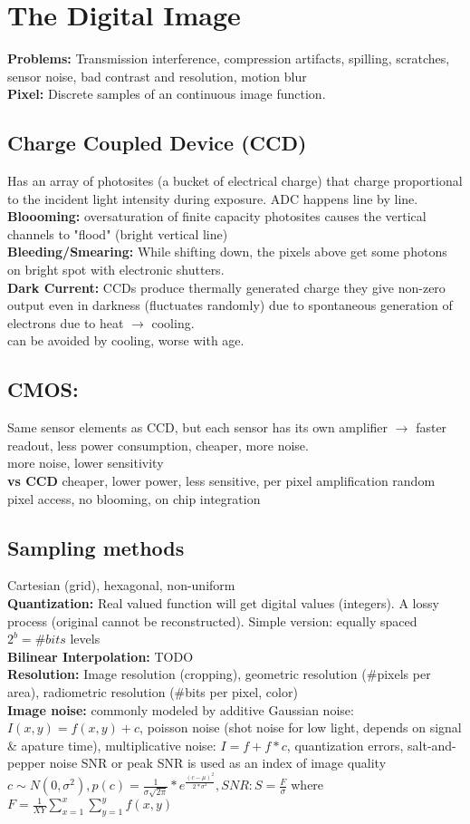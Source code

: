 \section*{The Digital Image}
\textbf{Problems:} Transmission interference, compression artifacts, spilling, scratches, sensor noise, bad contrast and resolution, motion blur \\
\textbf{Pixel:} Discrete samples of an continuous image function.
\subsection*{Charge Coupled Device (CCD)}
Has an array of photosites (a bucket of electrical charge) that charge proportional to the incident light intensity during exposure. ADC happens line by line. \\
\textbf{Bloooming:} oversaturation of finite capacity photosites causes the vertical channels to "flood" (bright vertical line)\\
\textbf{Bleeding/Smearing:} While shifting down, the pixels above get some photons on bright spot with electronic shutters.\\
\textbf{Dark Current:} CCDs produce thermally generated charge they give non-zero output even in darkness (fluctuates randomly) due to spontaneous generation of electrons due to heat $\rightarrow$ cooling.\\ can be avoided by cooling, worse with age.
\subsection*{CMOS:}
Same sensor elements as CCD, but each sensor has its own amplifier $\rightarrow$ faster readout, less power consumption, cheaper, more noise.\\ more noise, lower sensitivity\\
\textbf{vs CCD} cheaper, lower power, less sensitive, per pixel amplification random pixel access, no blooming, on chip integration
\subsection*{Sampling methods}
Cartesian (grid), hexagonal, non-uniform\\
\textbf{Quantization:} Real valued function will get digital values (integers). A lossy process (original cannot be reconstructed). Simple version: equally spaced $2^b = \#bits$ levels\\
\textbf{Bilinear Interpolation:} TODO\\
\textbf{Resolution:} Image resolution (cropping), geometric resolution (\#pixels per area), radiometric resolution (\#bits per pixel, color)\\
\textbf{Image noise:} commonly modeled by additive Gaussian noise: $I(x, y) = f(x, y) + c$, poisson noise (shot noise for low light, depends on signal \& apature time), multiplicative noise: $I = f + f * c$, quantization errors, salt-and-pepper noise SNR or peak SNR is used as an index of image quality $c \sim N(0, \sigma^2), p(c) = \frac{1}{\sigma \sqrt{2\pi}} * e^{\frac{(c - \mu)^{2}}{2 * \sigma^{2}}}, SNR: S = \frac{F}{\sigma}$ where $F = \frac{1}{XY}\sum_{x = 1}^x \sum_{y = 1}^{y} f(x, y)$
